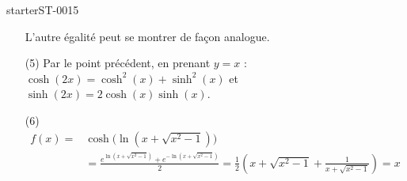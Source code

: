 \begin{corrige}{starterST-0015}
\begin{enumerate}
\begin{equation*}
  \end{equation*}
  L'autre égalité peut se montrer de façon analogue.
\item[(5)] Par le point précédent, en prenant $y=x$ : $\cosh(2x)=\cosh^2(x)+\sinh^2(x) $ et $\sinh(2x)= 2\cosh(x)\sinh(x) $.
 \item[(6)] 
   \begin{equation*}
     \begin{aligned}
       f(x)=&\cosh\Big(\ln(x+\sqrt{x^2-1})\Big)\\
       &=\frac{e^{\ln(x+\sqrt{x^2-1})}+e^{-\ln(x+\sqrt{x^2-1})}}{2} = \frac{1}{2}\left(x+\sqrt{x^2-1} + \frac{1}{x+\sqrt{x^2-1}}\right)=x
     \end{aligned}
   \end{equation*}
\end{enumerate}

\end{corrige}
